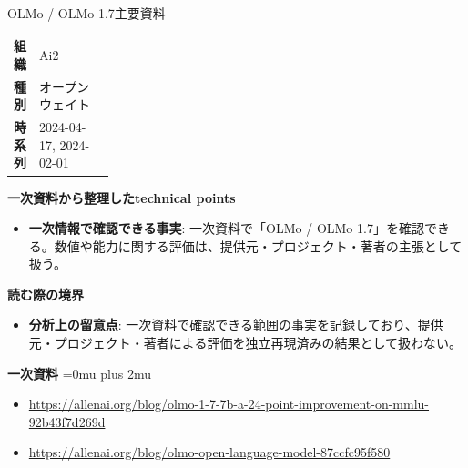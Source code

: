 \begin{technicalnote}{OLMo / OLMo 1.7}{主要資料}
\begingroup
\begin{tabularx}{\linewidth}{@{}>{\bfseries}p{0.22\linewidth}X@{}}
組織 & Ai2 \\
種別 & オープンウェイト \\
時系列 & 2024-04-17, 2024-02-01 \\
\end{tabularx}
\smallskip
{\bfseries 一次資料から整理したtechnical points}
\begin{itemize}[leftmargin=1.5em,itemsep=0.35em]
\item \textbf{一次情報で確認できる事実}: 一次資料で「OLMo / OLMo 1.7」を確認できる。数値や能力に関する評価は、提供元・プロジェクト・著者の主張として扱う。
\end{itemize}
\begin{minipage}{\linewidth}
{\bfseries 読む際の境界}
\begin{itemize}[leftmargin=1.5em,itemsep=0.35em]
\item \textbf{分析上の留意点}: 一次資料で確認できる範囲の事実を記録しており、提供元・プロジェクト・著者による評価を独立再現済みの結果として扱わない。
\end{itemize}
\begin{samepage}
{\bfseries 一次資料}
\begingroup\sloppy
\Urlmuskip=0mu plus 2mu\relax
\begin{itemize}[leftmargin=1.5em,itemsep=0.25em]
\item {\scriptsize\url{https://allenai.org/blog/olmo-1-7-7b-a-24-point-improvement-on-mmlu-92b43f7d269d}}
\item {\scriptsize\url{https://allenai.org/blog/olmo-open-language-model-87ccfc95f580}}
\end{itemize}
\endgroup
\end{samepage}
\end{minipage}
\endgroup
\end{technicalnote}
\medskip

